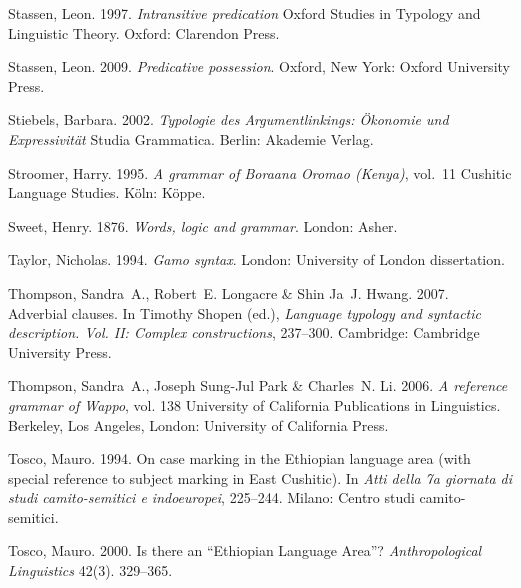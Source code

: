 \documentclass[ number=1
			   ,series=sidl
				,url=http://langsci-press.org/catalog/book/18 
			   ,isbn=978-3-944675-19-0
			   ,output=long   %
			  ]{LSP/langsci}
\begin{document}
\begin{thebibliography}{190}
Stassen, Leon. 1997.
\newblock \emph{Intransitive predication} Oxford Studies in Typology and
  Linguistic Theory.
\newblock Oxford: Clarendon Press.

Stassen, Leon. 2009.
\newblock \emph{Predicative possession}.
\newblock Oxford, New York: Oxford University Press.

Stiebels, Barbara. 2002.
\newblock \emph{Typologie des {A}rgumentlinkings: {\"O}konomie und
  {E}xpressivit{\"a}t} Studia Grammatica.
\newblock Berlin: Akademie Verlag.

Stroomer, Harry. 1995.
\newblock \emph{A grammar of {B}oraana {O}romao ({K}enya)}, vol.~11 Cushitic
  Language Studies.
\newblock K{\"o}ln: K{\"o}ppe.

Sweet, Henry. 1876.
\newblock \emph{Words, logic and grammar}.
\newblock London: Asher.

Taylor, Nicholas. 1994.
\newblock \emph{{G}amo syntax}.
\newblock London: University of London dissertation.

Thompson, Sandra~A., Robert~E. Longacre \& Shin Ja~J. Hwang. 2007.
\newblock Adverbial clauses.
\newblock In Timothy Shopen (ed.), \emph{Language typology and syntactic
  description. {V}ol. {II}: {C}omplex constructions}, 237--300. Cambridge:
  Cambridge University Press.

Thompson, Sandra~A., Joseph Sung-Jul Park \& {\relax Ch}arles~N. Li. 2006.
\newblock \emph{A reference grammar of {W}appo}, vol. 138 University of
  California Publications in Linguistics.
\newblock Berkeley, Los Angeles, London: University of California Press.

Tosco, Mauro. 1994.
\newblock On case marking in the {E}thiopian language area (with special
  reference to subject marking in {E}ast {C}ushitic).
\newblock In \emph{Atti della 7a giornata di studi camito-semitici e
  indoeuropei}, 225--244. Milano: Centro studi camito-semitici.

Tosco, Mauro. 2000.
\newblock Is there an ``{E}thiopian {L}anguage {A}rea''?
\newblock \emph{Anthropological Linguistics} 42(3). 329--365.


\end{thebibliography}
\end{document}
